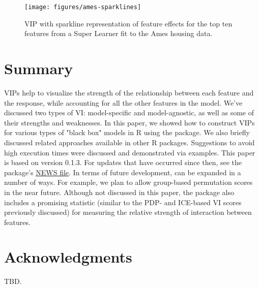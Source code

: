 \begin{figure}[!htb]
  \centering 
  \texttt{[image: figures/ames-sparklines]} 
  \caption{VIP with sparkline representation of feature effects for the top ten features from a Super Learner fit to the Ames housing data.}
  \label{fig:sparklines}
\end{figure}


\section{Summary}

VIPs help to visualize the strength of the relationship between each feature and the response, while accounting for all the other features in the model. We've discussed two types of VI: model-specific and model-agnostic, as well as some of their strengths and weaknesses. In this paper, we showed how
to construct VIPs for various types of "black box" models in R using the  package. We also briefly
discussed related approaches available in other R packages. Suggestions to avoid
high execution times were discussed and demonstrated via examples. This paper is based on  version 0.1.3. For updates that have occurred since then, see the package’s \href{https://cran.r-project.org/web/packages/vip/news/news.html}{NEWS file}. In terms of future development,  can be expanded in a number of ways. For
example, we plan to allow group-based permutation scores in the near future. Although not discussed in this paper, the package also includes a promising statistic (similar to the PDP- and ICE-based VI scores previously discussed) for measuring the relative strength of interaction between features. 


\section{Acknowledgments}

TBD.




\address{Brandon M. Greenwell\\
  Department of Mathematics and Statistics\\
  Wright State University\\
  3640 Colonel Glenn Hwy\\ 
  Dayton, OH 45435\\
  United States of America\\
  ORCiD: \href{https://orcid.org/0000-0002-8120-0084}{0000-0002-8120-0084}\\
  }

\address{Bradley C. Boehmke\\
  University of Cincinnati\\
  2925 Campus Green Dr\\
  Cincinnati, OH 45221\\
  United States of America\\
  ORCiD: \href{https://orcid.org/0000-0002-3611-8516}{0000-0002-3611-8516}\\
  }
